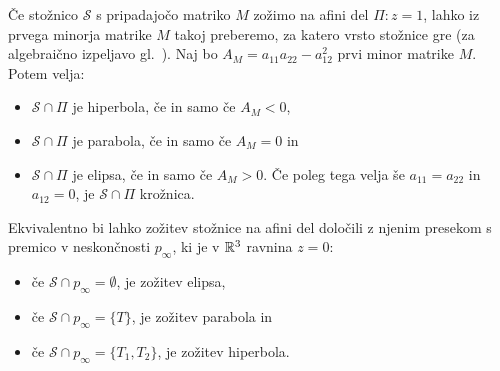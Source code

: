 Če stožnico $\mathcal{S}$ s pripadajočo matriko $M$ zožimo na afini del $\Pi: z=1$, lahko iz prvega minorja matrike $M$ takoj preberemo, za katero vrsto stožnice gre (za algebraično izpeljavo gl.\ \cite{sivic2020}). Naj bo $A_M = a_{11}a_{22} - a_{12}^2$ prvi minor matrike $M$. Potem velja:
\begin{itemize}
    \item $\mathcal{S} \cap \Pi$ je hiperbola, če in samo če $A_M < 0$,
    \item $\mathcal{S} \cap \Pi$ je parabola, če in samo če $A_M = 0$ in
    \item $\mathcal{S} \cap \Pi$ je elipsa, če in samo če $A_M > 0$. Če poleg tega velja še $a_{11} = a_{22}$ in $a_{12} = 0$, je $\mathcal{S} \cap \Pi$ krožnica.
\end{itemize}
Ekvivalentno bi lahko zožitev stožnice na afini del določili z njenim presekom s premico v neskončnosti $p_\infty$, ki je v $\mathbb R^3$ ravnina $z = 0$:
\begin{itemize}
    \item če $\mathcal{S} \cap p_\infty = \emptyset$, je zožitev elipsa,
    \item če $\mathcal{S} \cap p_\infty = \{T\}$, je zožitev parabola in
    \item če $\mathcal{S} \cap p_\infty = \{T_1, T_2\}$, je zožitev hiperbola.
\end{itemize}

